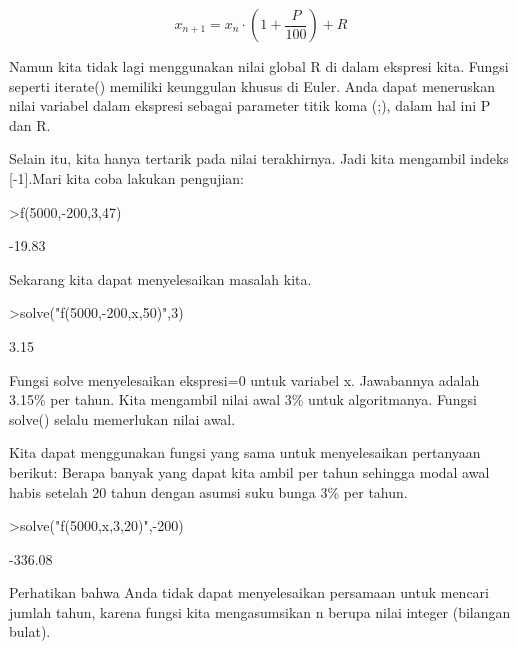 \documentclass{article}
\newenvironment{eulernotebook}{\par}{\par}
\newenvironment{eulercomment}{\par\medskip}{\par\medskip}
\newenvironment{eulerformula}{}{}
\begin{document}
\begin{eulernotebook}
\begin{eulercomment}
\begin{eulercomment}
\begin{eulercomment}
\begin{eulercomment}
\begin{eulercomment}
\begin{eulercomment}
\begin{eulercomment}
\begin{eulercomment}
\begin{eulercomment}
\begin{eulercomment}
\begin{eulercomment}
\end{eulercomment}
\begin{eulerformula}
\[
x_{n+1} = x_n \cdot \left(1+ \frac{P}{100}\right) + R
\]
\end{eulerformula}
\begin{eulercomment}
Namun kita tidak lagi menggunakan nilai global \textdollar{}R\textdollar{} di dalam ekspresi
kita. Fungsi seperti iterate() memiliki keunggulan khusus di Euler.
Anda dapat meneruskan nilai variabel dalam ekspresi sebagai parameter
titik koma (;), dalam hal ini P dan R.

Selain itu, kita hanya tertarik pada nilai terakhirnya. Jadi kita
mengambil indeks [-1].Mari kita coba lakukan pengujian:
\end{eulercomment}
\begin{eulerprompt}
>f(5000,-200,3,47)
\end{eulerprompt}
\begin{euleroutput}
       -19.83 
\end{euleroutput}
\begin{eulercomment}
Sekarang kita dapat menyelesaikan masalah kita.
\end{eulercomment}
\begin{eulerprompt}
>solve("f(5000,-200,x,50)",3)
\end{eulerprompt}
\begin{euleroutput}
         3.15 
\end{euleroutput}
\begin{eulercomment}
Fungsi solve menyelesaikan ekspresi=0 untuk variabel x. Jawabannya
adalah 3.15\% per tahun. Kita mengambil nilai awal 3\% untuk
algoritmanya. Fungsi solve() selalu memerlukan nilai awal.

Kita dapat menggunakan fungsi yang sama untuk menyelesaikan pertanyaan
berikut: Berapa banyak yang dapat kita ambil per tahun sehingga modal
awal habis setelah 20 tahun dengan asumsi suku bunga 3\% per tahun.
\end{eulercomment}
\begin{eulerprompt}
>solve("f(5000,x,3,20)",-200)
\end{eulerprompt}
\begin{euleroutput}
      -336.08 
\end{euleroutput}
\begin{eulercomment}
Perhatikan bahwa Anda tidak dapat menyelesaikan persamaan untuk
mencari jumlah tahun, karena fungsi kita mengasumsikan \textdollar{}n\textdollar{} berupa
nilai integer (bilangan bulat).


\end{eulercomment}
\end{eulercomment}
\end{eulercomment}
\end{eulercomment}
\end{eulercomment}
\end{eulercomment}
\end{eulercomment}
\end{eulercomment}
\end{eulercomment}
\end{eulercomment}
\end{eulercomment}
\end{eulernotebook}
\end{document}
